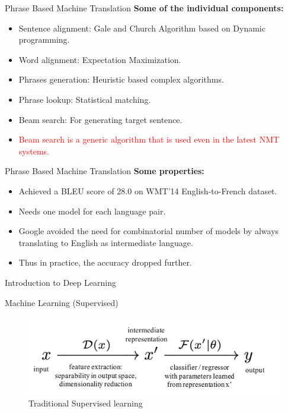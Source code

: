 ﻿\documentclass[table,aspectratio=43,mathserif,xcolor={usenames,dvipsnames,svgnames,table},10pt]{beamer}
\begin{document}
\begin{frame}{Phrase Based Machine Translation}
\textbf{Some of the individual components:}
 \begin{itemize}
  \item<+-> Sentence alignment: Gale and Church Algorithm based on Dynamic programming.
  \item<+-> Word alignment: Expectation Maximization.
  \item<+-> Phrases generation: Heuristic based complex algorithms.
  \item<+-> Phrase lookup: Statistical matching.
  \item<+-> Beam search: For generating target sentence.
  \item<+-> \textcolor{red} {Beam search is a generic algorithm that is used even in the latest NMT systems.}
 \end{itemize}
\end{frame}

\begin{frame}{Phrase Based Machine Translation}
\textbf{Some properties:}
 \begin{itemize}
  \item<+-> Achieved a BLEU score of 28.0 on WMT’14 English-to-French dataset.
  \item<+-> Needs one model for each language pair.
  \item<+-> Google avoided the need for combinatorial number of models by always translating to English as intermediate language.
  \item<+-> Thus in practice, the accuracy dropped further. 
  \end{itemize}

\end{frame}

\begin{section}{Introduction to Deep Learning}
\end{section}

\begin{frame}{Machine Learning (Supervised)}
 \begin{figure}[h]
    \includegraphics[width=0.9\linewidth]{images/ml.png}  
    \caption{Traditional Supervised learning}
  \end{figure}
\end{frame}
\end{document}
